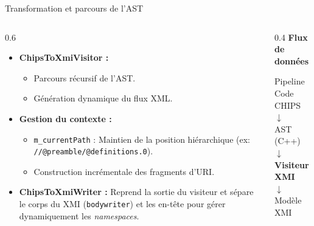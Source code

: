 \begin{frame}{Transformation et parcours de l'AST}
    \begin{columns}
        \begin{column}{0.6\textwidth}
            \begin{itemize}
                \item \textbf{ChipsToXmiVisitor :}
                \begin{itemize}
                    \item Parcours récursif de l'AST.
                    \item Génération dynamique du flux XML.
                \end{itemize}
                \item \textbf{Gestion du contexte :}
                \begin{itemize}
                    \item \texttt{m\_currentPath} : Maintien de la position hiérarchique (ex: \texttt{//@preamble/@definitions.0}).
                    \item Construction incrémentale des fragments d'URI.
                \end{itemize}
                \item \textbf{ChipsToXmiWriter :} Reprend la sortie du visiteur et sépare le corps du XMI (\texttt{bodywriter}) et les en-tête pour gérer dynamiquement les \textit{namespaces}.
            \end{itemize}
        \end{column}
        \begin{column}{0.4\textwidth}
            \centering
            \textbf{Flux de données}
            \vspace{0.5cm}
            \begin{exampleblock}{Pipeline}
                Code CHIPS \\
                $\downarrow$ \\
                AST (C++) \\
                $\downarrow$ \\
                \textbf{Visiteur XMI} \\
                $\downarrow$ \\
                Modèle XMI
            \end{exampleblock}
        \end{column}
    \end{columns}
\end{frame}

